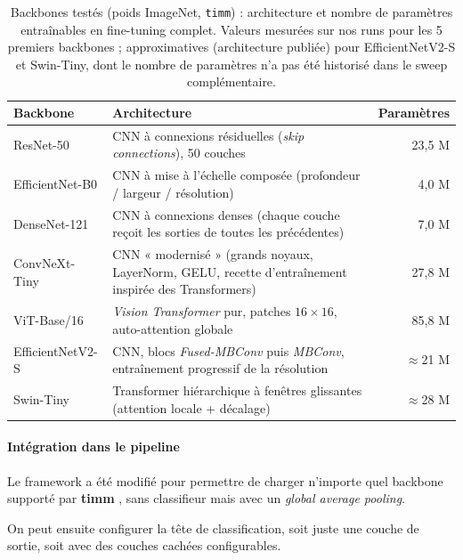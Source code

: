 \begin{table}[H]
  \centering
  \small
  \renewcommand{\arraystretch}{1.15}
  \begin{tabularx}{\textwidth}{@{} l X r @{}}
    \toprule
    Backbone & Architecture & Paramètres \\
    \midrule
    ResNet-50         & CNN à connexions résiduelles (\emph{skip connections}), 50 couches & 23,5 M \\
    EfficientNet-B0   & CNN à mise à l'échelle composée (profondeur / largeur / résolution) & 4,0 M \\
    DenseNet-121      & CNN à connexions denses (chaque couche reçoit les sorties de toutes les précédentes) & 7,0 M \\
    ConvNeXt-Tiny     & CNN « modernisé » (grands noyaux, LayerNorm, GELU, recette d'entraînement inspirée des Transformers) & 27,8 M \\
    ViT-Base/16       & \emph{Vision Transformer} pur, patches $16\times16$, auto-attention globale & 85,8 M \\
    EfficientNetV2-S  & CNN, blocs \emph{Fused-MBConv} puis \emph{MBConv}, entraînement progressif de la résolution & $\approx$21 M \\
    Swin-Tiny         & Transformer hiérarchique à fenêtres glissantes (attention locale + décalage) & $\approx$28 M \\
    \bottomrule
  \end{tabularx}
  \caption{Backbones testés (poids ImageNet, \texttt{timm}) : architecture et nombre de paramètres entraînables en fine-tuning complet.
Valeurs mesurées sur nos runs pour les 5 premiers backbones ; approximatives (architecture publiée) pour EfficientNetV2-S et Swin-Tiny, dont le nombre de paramètres n'a pas été historisé dans le sweep complémentaire.}
  \label{tab:transfer-backbones}
\end{table}

\paragraph{Intégration dans le pipeline}

Le framework a été modifié pour permettre de charger n'importe quel backbone supporté par \textbf{timm} \parencite{wightman2019timm}, sans classifieur mais avec un \emph{global average pooling}.

On peut ensuite configurer la tête de classification, soit juste une couche de sortie, soit avec des couches cachées configurables.

